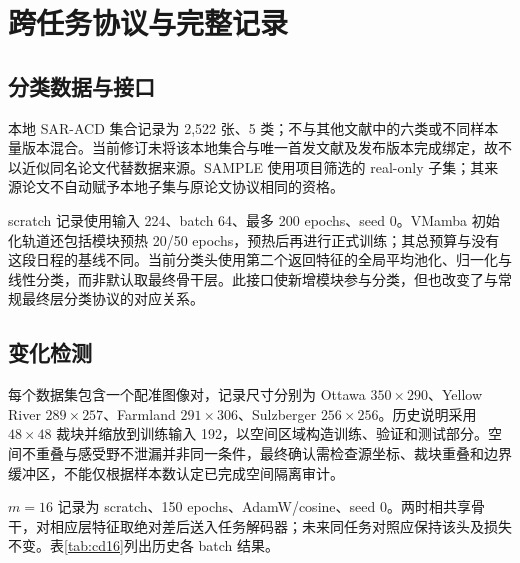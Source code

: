 \documentclass[UTF8,11pt,a4paper,fontset=fandol]{ctexart}
\begin{document}
\section{跨任务协议与完整记录}\label{app:cross}
\subsection{分类数据与接口}
本地 SAR-ACD 集合记录为 2,522 张、5 类；不与其他文献中的六类或不同样本量版本混合。当前修订未将该本地集合与唯一首发文献及发布版本完成绑定，故不以近似同名论文代替数据来源。SAMPLE 使用项目筛选的 real-only 子集；其来源论文\cite{sample2019}不自动赋予本地子集与原论文协议相同的资格。

scratch 记录使用输入 224、batch 64、最多 200 epochs、seed 0。VMamba 初始化轨道还包括模块预热 20/50 epochs，预热后再进行正式训练；其总预算与没有这段日程的基线不同。当前分类头使用第二个返回特征的全局平均池化、归一化与线性分类，而非默认取最终骨干层。此接口使新增模块参与分类，但也改变了与常规最终层分类协议的对应关系。

\subsection{变化检测}
每个数据集包含一个配准图像对，记录尺寸分别为 Ottawa $350\times290$、Yellow River $289\times257$、Farmland $291\times306$、Sulzberger $256\times256$。历史说明采用 $48\times48$ 裁块并缩放到训练输入 192，以空间区域构造训练、验证和测试部分。空间不重叠与感受野不泄漏并非同一条件，最终确认需检查源坐标、裁块重叠和边界缓冲区，不能仅根据样本数认定已完成空间隔离审计。

$m=16$ 记录为 scratch、150 epochs、AdamW/cosine、seed 0。两时相共享骨干，对相应层特征取绝对差后送入任务解码器；未来同任务对照应保持该头及损失不变。表\ref{tab:cd16}列出历史各 batch 结果。
\end{document}
